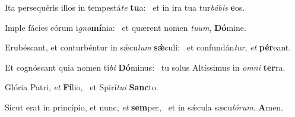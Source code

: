 \item Ita persequéris illos in tempestá\textit{te} \textbf{tu}a:~\psstar{} et in ira tua tur\textit{bábis} \textbf{e}os.

\item Imple fácies eórum i\textit{gno}\textbf{mí}nia:~\psstar{} et quærent nomen \textit{tuum}, \textbf{Dó}mine.

\item Erubéscant, et conturbéntur in sǽcu\textit{lum} \textbf{sǽ}culi:~\psstar{} et confundán\textit{tur}, \textit{et} \textbf{pér}eant.

\item Et cognóscant quia nomen ti\textit{bi} \textbf{Dó}minus:~\psstar{} tu solus Altíssimus in \textit{omni} \textbf{ter}ra.

\item Glória Patri, \textit{et} \textbf{Fí}lio,~\psstar{} et Spirí\textit{tui} \textbf{Sanc}to.

\item Sicut erat in princípio, et nunc, \textit{et} \textbf{sem}per,~\psstar{} et in sǽcula sæcu\textit{lórum}. \textbf{A}men.